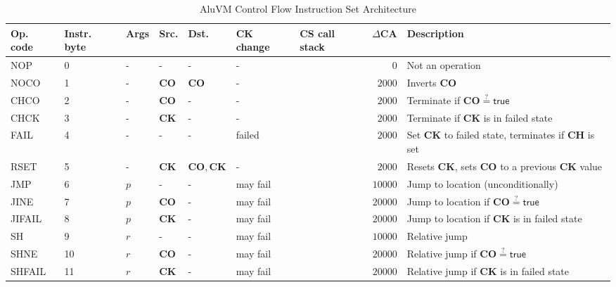\documentclass[9pt,oneside]{amsart}
\begin{document}
\begin{table}[h]
\centering
\caption{AluVM Control Flow Instruction Set Architecture}\label{tab:aluvm}
\begin{tabular}{l p{1cm} l p{1cm} p{1cm} p{1.5cm} p{1cm} r p{5cm}}
\toprule
Op. code & Instr. byte & Args & Src. & Dst. & \textbf{CK} change & \textbf{CS} call stack & $\Delta\mathbf{CA}$ & Description \\
\midrule
NOP	    &0	&-  	&-      		&-                              &-	        &		&$0$      &Not an operation \\ \midrule
NOCO	&1	&-  	&\textbf{CO}	&$\mathbf{CO}$	                &-	      	&		&$2000$   &Inverts \textbf{CO} \\ \midrule
CHCO	&2	&-  	&\textbf{CO}	&-                              &-	      	&	    &$2000$   &Terminate if $\mathbf{CO} \stackrel{?}{=} \mathsf{true}$ \\ \midrule
CHCK	&3	&-  	&\textbf{CK}	&-                              &-	      	&	    &$2000$   &Terminate if \textbf{CK} is in failed state \\ \midrule
FAIL	&4	&-  	&-         		&-                              &\textsf{failed} &	&$2000$   &Set \textbf{CK} to failed state, terminates if \textbf{CH} is set \\ \midrule
RSET	&5	&-  	&\textbf{CK}	&$\mathbf{CO}, \mathbf{CK}$	    &-	      	&		&$2000$   &Resets \textbf{CK}, sets \textbf{CO} to a previous \textbf{CK} value \\ \midrule
JMP	    &6	&$p$\footnotemark[1] &-	&-                              &may fail	&		&$10000$  &Jump to location (unconditionally) \\ \midrule
JINE	&7	&$p$	&\textbf{CO}	&-                              &may fail	&		&$20000$  &Jump to location if $\mathbf{CO} \stackrel{?}{=} \mathsf{true}$ \\ \midrule
JIFAIL	&8	&$p$	&\textbf{CK}	&-                              &may fail	&		&$20000$  &Jump to location if \textbf{CK} is in failed state \\ \midrule
SH      &9	&$r$\footnotemark[2] &- &-                              &may fail	&		&$10000$  &Relative jump \\ \midrule
SHNE	&10	&$r$	&\textbf{CO}	&-                              &may fail	&		&$20000$  &Relative jump if $\mathbf{CO} \stackrel{?}{=} \mathsf{true}$ \\ \midrule
SHFAIL	&11	&$r$	&\textbf{CK}	&-                              &may fail	&		&$20000$  &Relative jump if \textbf{CK} is in failed state \\ \midrule

\end{tabular}
\end{table}
\end{document}
